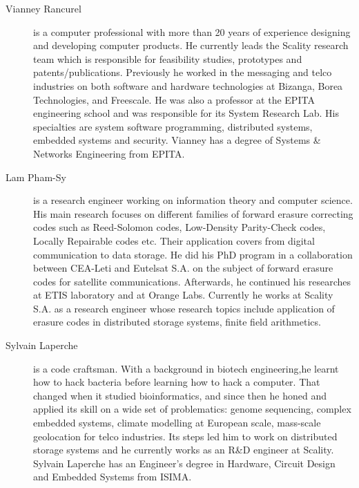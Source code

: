 \documentclass[oneside,9pt]{article}
\begin{document}
\begin{description}

\item[Vianney Rancurel] is a computer professional with more than 20 years of experience designing and developing computer products. He currently leads the Scality research team which is responsible for feasibility studies, prototypes and patents/publications. Previously he worked in the messaging and telco industries on both software and hardware technologies at Bizanga, Borea Technologies, and Freescale. He was also a professor at the EPITA engineering school and was responsible for its System Research Lab. His specialties are system software programming, distributed systems, embedded systems and security. Vianney has a degree of Systems \& Networks Engineering from EPITA.

\item[Lam Pham-Sy] is a research engineer working on information theory and computer science. His main research focuses on different families of forward erasure correcting codes such as Reed-Solomon codes, Low-Density Parity-Check codes, Locally Repairable codes etc. Their application covers from digital communication to data storage. He did his PhD program in a collaboration between CEA-Leti and Eutelsat S.A. on the subject of forward erasure codes for satellite communications. Afterwards, he continued his researches at ETIS laboratory and at Orange Labs. Currently he works at Scality S.A. as a research engineer whose research topics include application of erasure codes in distributed storage systems, finite field arithmetics.

\item[Sylvain Laperche] is a code craftsman. With a background in biotech engineering,he learnt how to hack bacteria before learning how to hack a computer. That changed when it studied bioinformatics, and since then he honed and applied its skill on a wide set of problematics: genome sequencing, complex embedded systems, climate modelling at European scale, mass-scale geolocation for telco industries. Its steps led him to work on distributed storage systems and he currently works as an R\&D engineer at Scality.
Sylvain Laperche has an Engineer's degree in Hardware, Circuit Design and Embedded Systems from ISIMA.

\end{description}
\end{document}
